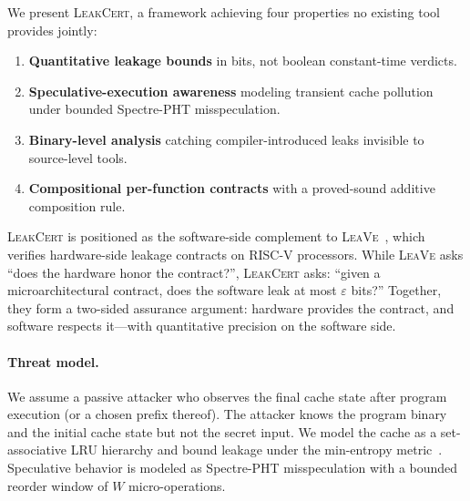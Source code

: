 \documentclass{article}
\theoremstyle{definition}
\theoremstyle{remark}
\newcommand{\LeakCert}{\textsc{LeakCert}}
\newcommand{\LeaVe}{\textsc{LeaVe}}
\begin{document}
We present \LeakCert{}, a framework achieving four properties no
existing tool provides jointly:
\begin{enumerate}[nosep]
  \item \textbf{Quantitative leakage bounds} in bits, not boolean
        constant-time verdicts.
  \item \textbf{Speculative-execution awareness} modeling transient
        cache pollution under bounded Spectre-PHT misspeculation.
  \item \textbf{Binary-level analysis} catching compiler-introduced
        leaks invisible to source-level tools.
  \item \textbf{Compositional per-function contracts} with a
        proved-sound additive composition rule.
\end{enumerate}

\noindent
\LeakCert{} is positioned as the software-side complement to
\LeaVe{}~\cite{gleissenthall2023leave}, which verifies hardware-side
leakage contracts on RISC-V processors.  While \LeaVe{} asks ``does
the hardware honor the contract?'', \LeakCert{} asks: ``given a
microarchitectural contract, does the software leak at most
$\varepsilon$ bits?''  Together, they form a two-sided assurance
argument: hardware provides the contract, and software respects
it---with quantitative precision on the software side.

\paragraph{Threat model.}
We assume a passive attacker who observes the final cache state after
program execution (or a chosen prefix thereof).  The attacker knows the
program binary and the initial cache state but not the secret input.
We model the cache as a set-associative LRU hierarchy and bound
leakage under the min-entropy metric~\cite{smith2009foundations}.
Speculative behavior is modeled as Spectre-PHT misspeculation with a
bounded reorder window of $W$ micro-operations.
\end{document}
